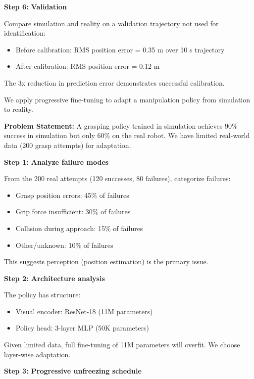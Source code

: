 \begin{example}
\textbf{Step 6: Validation}

Compare simulation and reality on a validation trajectory not used for identification:
\begin{itemize}
    \item Before calibration: RMS position error = 0.35 m over 10 s trajectory
    \item After calibration: RMS position error = 0.12 m
\end{itemize}

The 3x reduction in prediction error demonstrates successful calibration.
\end{example}

\begin{example}
\label{ex:progressive_finetuning}
We apply progressive fine-tuning to adapt a manipulation policy from simulation to reality.

\textbf{Problem Statement:}
A grasping policy trained in simulation achieves 90\% success in simulation but only 60\% on the real robot. We have limited real-world data (200 grasp attempts) for adaptation.

\textbf{Step 1: Analyze failure modes}

From the 200 real attempts (120 successes, 80 failures), categorize failures:
\begin{itemize}
    \item Grasp position errors: 45\% of failures
    \item Grip force insufficient: 30\% of failures
    \item Collision during approach: 15\% of failures
    \item Other/unknown: 10\% of failures
\end{itemize}

This suggests perception (position estimation) is the primary issue.

\textbf{Step 2: Architecture analysis}

The policy has structure:
\begin{itemize}
    \item Visual encoder: ResNet-18 (11M parameters)
    \item Policy head: 3-layer MLP (50K parameters)
\end{itemize}

Given limited data, full fine-tuning of 11M parameters will overfit. We choose layer-wise adaptation.

\textbf{Step 3: Progressive unfreezing schedule}


\end{example}
